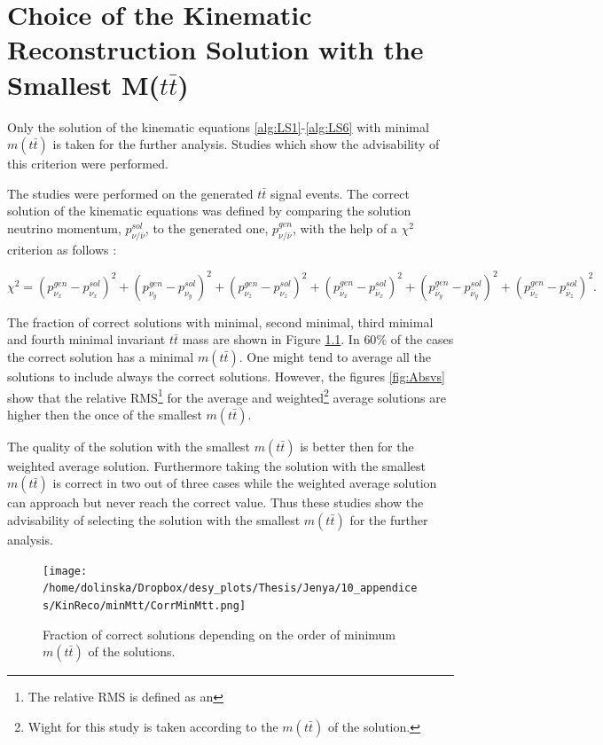 \chapter{Choice of the Kinematic Reconstruction Solution with the Smallest M($t\bar{t}$)}\label{appendix:mtt}

Only the solution of the kinematic equations \ref{alg:LS1}-\ref{alg:LS6} with minimal $m(t\bar{t})$ is taken for the further analysis.
Studies which show the advisability of this criterion were performed.

The studies were performed on the generated $t\bar{t}$ signal events. The correct solution of the kinematic equations was defined by comparing the 
solution neutrino momentum, $p_{\nu/\bar{\nu}}^{sol}$, to the generated one, $p_{\nu/\bar{\nu}}^{gen}$, with the help of a $\chi^{2}$ criterion as follows \cite{Sonnenschein:2005ed}:

\begin{equation}
 \chi^{2} = (p_{\nu_{x}}^{gen} - p_{\nu_{x}}^{sol})^{2} + (p_{\nu_{y}}^{gen} - p_{\nu_{y}}^{sol})^{2} + (p_{\nu_{z}}^{gen} - p_{\nu_{z}}^{sol})^{2} + (p_{\bar{\nu}_{x}}^{gen} - p_{\bar{\nu}_{x}}^{sol})^{2} +
 (p_{\bar{\nu}_{y}}^{gen} - p_{\bar{\nu}_{y}}^{sol})^{2} + (p_{\bar{\nu}_{z}}^{gen} - p_{\bar{\nu}_{z}}^{sol})^{2}.
\end{equation}

The fraction of correct solutions with minimal, second minimal, third minimal and fourth minimal invariant $t\bar{t}$ mass are shown in Figure \ref{fig:corrMinMtt}. In $60\%$ of 
the cases the correct solution has a minimal $m(t\bar{t})$. One might tend to average all the solutions to include always the correct solutions. However, the figures \ref{fig:Absvs}
show that the relative RMS\footnote{The relative RMS is defined as an } for the average and weighted\footnote{Wight for this study is taken according to the $m(t\bar{t})$ of the solution.} average solutions are higher then the once
of the smallest $m(t\bar{t})$.

The quality of the solution with the smallest $m(t\bar{t})$ is better then for the weighted average solution. Furthermore taking the solution with the smallest $m(t\bar{t})$ is
correct in two out of three cases while the weighted average solution can approach but never reach the correct value. Thus these studies show the advisability of selecting the
solution with the smallest $m(t\bar{t})$ for the further analysis.

\begin{figure}[t]
  \centering
  \texttt{[image: /home/dolinska/Dropbox/desy\_plots/Thesis/Jenya/10\_appendices/KinReco/minMtt/CorrMinMtt.png]}
  \caption{Fraction of correct solutions depending on the order of minimum $m(t\bar{t})$ of the solutions.}
  \label{fig:corrMinMtt}
\end{figure}

